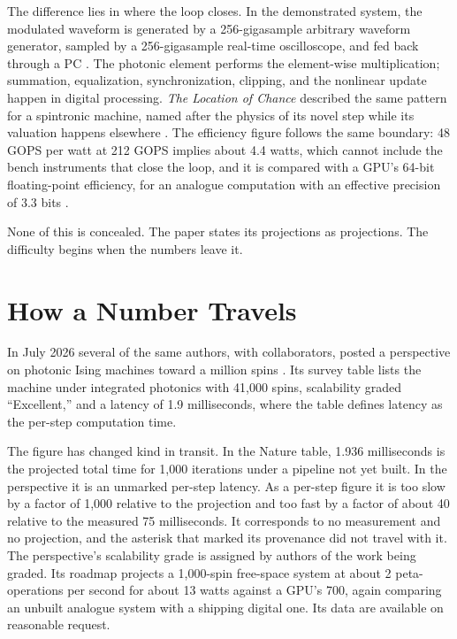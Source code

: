 \documentclass[11pt]{article}
\theoremstyle{definition}
\theoremstyle{remark}
\begin{document}
The difference lies in where the loop closes. In the demonstrated system, the modulated waveform is generated by a 256-gigasample arbitrary waveform generator, sampled by a 256-gigasample real-time oscilloscope, and fed back through a PC \cite{alkayed2025}. The photonic element performs the element-wise multiplication; summation, equalization, synchronization, clipping, and the nonlinear update happen in digital processing. \emph{The Location of Chance} described the same pattern for a spintronic machine, named after the physics of its novel step while its valuation happens elsewhere \cite{flyxion-chance}. The efficiency figure follows the same boundary: 48 GOPS per watt at 212 GOPS implies about 4.4 watts, which cannot include the bench instruments that close the loop, and it is compared with a GPU's 64-bit floating-point efficiency, for an analogue computation with an effective precision of 3.3 bits \cite{alkayed2025}.

None of this is concealed. The paper states its projections as projections. The difficulty begins when the numbers leave it.

\section{How a Number Travels}

In July 2026 several of the same authors, with collaborators, posted a perspective on photonic Ising machines toward a million spins \cite{aadhi2026}. Its survey table lists the machine under integrated photonics with 41,000 spins, scalability graded ``Excellent,'' and a latency of 1.9 milliseconds, where the table defines latency as the per-step computation time.

The figure has changed kind in transit. In the Nature table, 1.936 milliseconds is the projected total time for 1,000 iterations under a pipeline not yet built. In the perspective it is an unmarked per-step latency. As a per-step figure it is too slow by a factor of 1,000 relative to the projection and too fast by a factor of about 40 relative to the measured 75 milliseconds. It corresponds to no measurement and no projection, and the asterisk that marked its provenance did not travel with it. The perspective's scalability grade is assigned by authors of the work being graded. Its roadmap projects a 1,000-spin free-space system at about 2 peta-operations per second for about 13 watts against a GPU's 700, again comparing an unbuilt analogue system with a shipping digital one. Its data are available on reasonable request.
\end{document}
